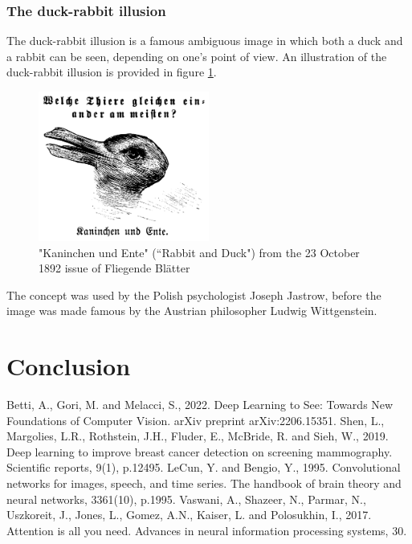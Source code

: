 \documentclass[12pt]{article}
\begin{document}
\subsubsection{The duck-rabbit illusion}
The duck-rabbit illusion is a famous ambiguous image in which both a duck and a rabbit can be seen, depending on one's point of view. An illustration of the duck-rabbit illusion is provided in figure \ref{fig: duck-rabbit}.
\begin{figure}[ht]
  \centering
  \includegraphics[width=0.5\textwidth]{images/rabbit_duck.png}
  \caption{"Kaninchen und Ente" (``Rabbit and Duck") from the 23 October 1892 issue of Fliegende Blätter}
  \label{fig: duck-rabbit}
\end{figure}
The concept was used by the Polish psychologist Joseph Jastrow, before the image was made famous by the Austrian philosopher Ludwig Wittgenstein.

\section{Conclusion}



\newpage
\begin{thebibliography}{99}
   Betti, A., Gori, M. and Melacci, S., 2022. Deep Learning to See: Towards New Foundations of Computer Vision. arXiv preprint arXiv:2206.15351. 
   Shen, L., Margolies, L.R., Rothstein, J.H., Fluder, E., McBride, R. and Sieh, W., 2019. Deep learning to improve breast cancer detection on screening mammography. Scientific reports, 9(1), p.12495. 
   LeCun, Y. and Bengio, Y., 1995. Convolutional networks for images, speech, and time series. The handbook of brain theory and neural networks, 3361(10), p.1995.
   Vaswani, A., Shazeer, N., Parmar, N., Uszkoreit, J., Jones, L., Gomez, A.N., Kaiser, L. and Polosukhin, I., 2017. Attention is all you need. Advances in neural information processing systems, 30.
\end{thebibliography}
\end{document}
